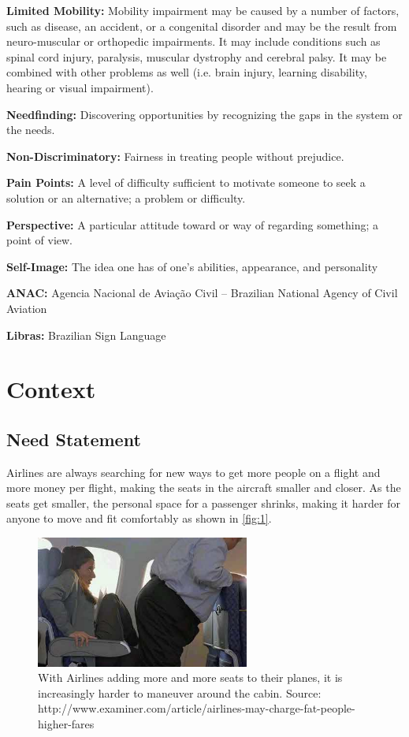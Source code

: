 \documentclass[a4paper, 12pt,conference]{new_cit_thesis}
\begin{document}
\begin{list}{-}{}
  \item \textbf{Limited Mobility:} Mobility impairment may be caused by a number of factors, such as disease, an accident, or a congenital disorder and may be the result from neuro-muscular or orthopedic impairments. It may include conditions such as spinal cord injury, paralysis, muscular dystrophy and cerebral palsy. It may be combined with other problems as well (i.e. brain injury, learning disability, hearing or visual impairment).
  \item \textbf{Needfinding:} Discovering opportunities by recognizing the gaps in the system or the needs.
  \item \textbf{Non-Discriminatory:} Fairness in treating people without prejudice.
  \item \textbf{Pain Points:} A level of difficulty sufficient to motivate someone to seek a solution or an alternative; a problem or difficulty.
  \item \textbf{Perspective:} A particular attitude toward or way of regarding something; a point of view.
  \item \textbf{Self-Image:} The idea one has of one's abilities, appearance, and personality
  \item \textbf{ANAC:} Agencia Nacional de Aviação Civil – Brazilian National Agency of Civil Aviation
  \item \textbf{Libras:} Brazilian Sign Language
\end{list}

\chapter{Context}

\section{Need Statement}
Airlines are always searching for new ways to get more people on a flight and more money per flight, making the seats in the aircraft smaller and closer. As the seats get smaller, the personal space for a passenger shrinks, making it harder for anyone to move and fit comfortably as shown in \ref{fig:1}.

\begin{figure}[h]
  \centering
     \includegraphics[width=7cm]{images/image009.png}
   \caption{With Airlines adding more and more seats to their planes, it is increasingly harder to maneuver around the cabin.
                  Source: http://www.examiner.com/article/airlines-may-charge-fat-people-higher-fares}
  \label{fig:9}
\end{figure}
\end{document}
